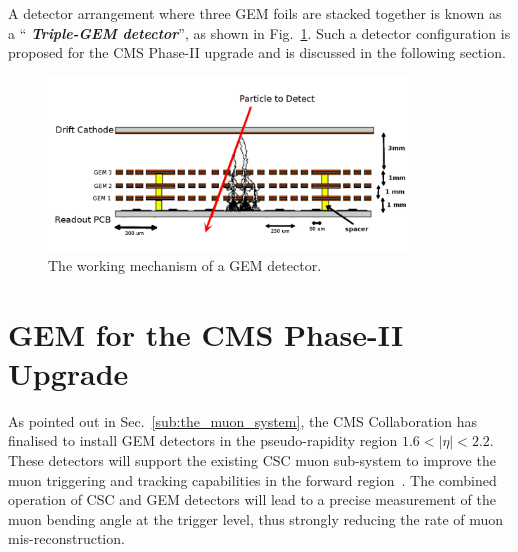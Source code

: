 A detector arrangement where three GEM foils are stacked together is known as a ``\textit{ \textbf{Triple-GEM detector}}'', as shown in Fig.~\ref{fig:gemgaps}. Such a detector configuration is proposed for the CMS Phase-II upgrade and is discussed in the following section.
\begin{figure}[!htbp]
    \begin{center}
        \includegraphics[width=0.85\textwidth]{figures/GEM/triple_gem.png}
        \caption{The working mechanism of a GEM detector.}
        \label{fig:gemgaps}
    \end{center}
\end{figure} 


\section{GEM for the CMS Phase-II Upgrade} %
\label{sec:gem_for_cms}
As pointed out in Sec.~\ref{sub:the_muon_system},  the CMS Collaboration has finalised to install GEM detectors in the pseudo-rapidity region $1.6 < |\eta| < 2.2$.
These detectors will support the existing CSC muon sub-system to improve the muon triggering and tracking capabilities in the forward region~\cite{Colaleo:2021453}.
The combined operation of CSC and GEM detectors will lead to a precise measurement of the muon bending angle at the trigger level, thus strongly reducing the rate of muon mis-reconstruction.

